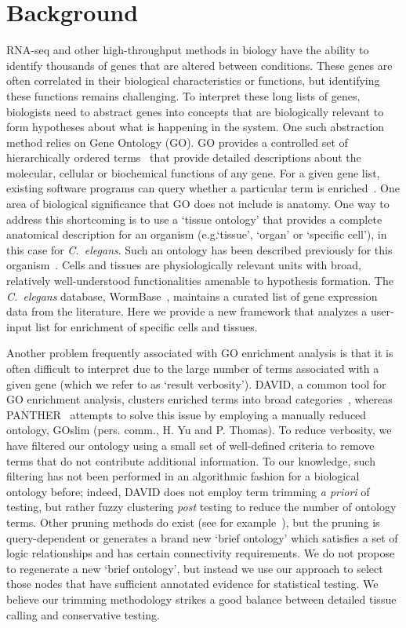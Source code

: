 \section*{Background}
	RNA-seq and other high-throughput methods in biology have the ability to
  identify thousands of genes that are altered between conditions. These genes
  are often correlated in their biological characteristics or functions, but
  identifying these functions remains challenging. To interpret these long lists
  of genes, biologists need to abstract genes into concepts that are biologically
  relevant to form hypotheses about what is happening in the system. One such
  abstraction method relies on Gene Ontology (GO). GO provides a controlled set
  of hierarchically ordered terms~\cite{TheGeneOntologyConsortium2000a,
  TheGeneOntologyConsortium2015} that provide detailed descriptions about the
  molecular, cellular or biochemical functions of any gene. For a given gene
  list, existing software programs can query whether a particular term is
  enriched~\cite{Mi2009, McLean2010, Huang2009, Pathan2015}. One area of
  biological significance that GO does not include is anatomy. One way to
  address this shortcoming is to use a `tissue ontology' that provides a
  complete anatomical description for an organism (e.g.`tissue', `organ' or
  `specific cell'), in this case for \emph{C.~elegans}. Such an ontology has
  been described previously for this organism~\cite{Lee2003}. Cells and tissues
  are physiologically relevant units with broad, relatively well-understood
  functionalities amenable to hypothesis formation. The \emph{C.~elegans}
  database, WormBase~\cite{Howe2016}, maintains a curated list of gene expression
  data from the literature. Here we provide a new framework that analyzes a
  user-input list for enrichment of specific cells and tissues.

Another problem frequently associated with GO enrichment analysis is that it
is often difficult to interpret due to the large number of terms associated with
a given gene (which we refer to as `result verbosity'). DAVID, a common tool for
GO enrichment analysis, clusters enriched terms into broad
categories~\cite{Huang2007}, whereas PANTHER~\cite{Mi2009, Mi2013} attempts to
solve this issue by employing a manually reduced ontology, GOslim (pers. comm.,
H. Yu and P. Thomas). To reduce verbosity, we have filtered our ontology using
a small set of well-defined criteria to remove terms that do not contribute
additional information. To our knowledge, such filtering has not been performed
in an algorithmic fashion for a biological ontology before; indeed, DAVID does
not employ term trimming \emph{a priori} of testing, but rather fuzzy clustering
\emph{post} testing to reduce the number of ontology terms. Other pruning methods
do exist (see for example~\cite{Kim2007, Garrido2012}), but the pruning is
query-dependent or generates a brand new `brief ontology' which satisfies a set
of logic relationships and has certain connectivity requirements. We do not
propose to regenerate a new `brief ontology', but instead we use our approach
to select those nodes that have sufficient annotated evidence for statistical
testing. We believe our trimming methodology strikes a good balance between
detailed tissue calling and conservative testing.

